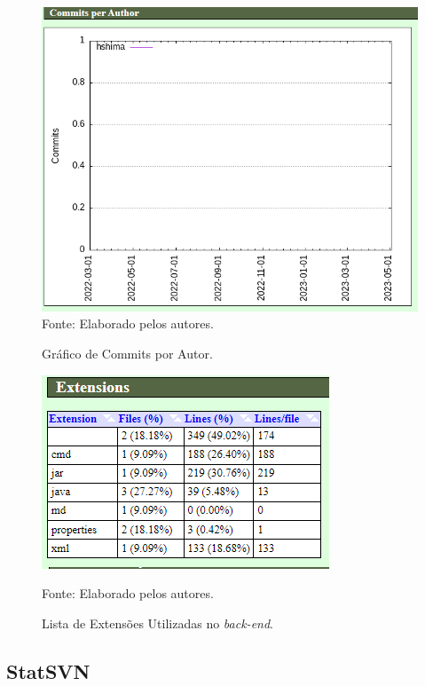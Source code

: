\documentclass[
    12pt,               %
    openright,          %
    oneside,
    a4paper,            %
    BIBLATEX,           %
    TODO,               %
    english,            %
    brazil              %
    ]{ifsp-spo-inf-ctds}
\begin{document}
            \begin{figure}[H]
                \centering
                \caption{Gráfico de Commits por Autor.}
                \includegraphics[width=1 \textwidth]{Gitstats/back-end/commitsAutorBack.png}
                {\footnotesize Fonte: Elaborado pelos autores.}
                \label{fig:commitBack}
            \end{figure}    

            \begin{figure}[H]
                \centering
                \caption{Lista de Extensões Utilizadas no \emph{back-end}.}
                \includegraphics[scale = 1.2]{Gitstats/back-end/extensoesBack.png}
                
                {\footnotesize Fonte: Elaborado pelos autores.}
                \label{fig:extensoesBack}
            \end{figure}  


    \subsection{StatSVN}
\end{document}
